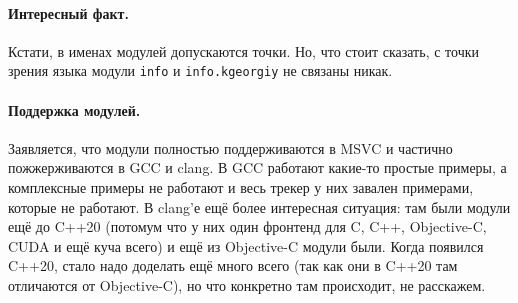\documentclass{article}
\begin{document}
    \paragraph{Интересный факт.}
    Кстати, в именах модулей допускаются точки. Но, что стоит сказать, с точки зрения языка модули \texttt{info} и \texttt{info.kgeorgiy} не связаны никак.
    \paragraph{Поддержка модулей.}
    Заявляется, что модули полностью поддерживаются в MSVC и частично пожжерживаются в GCC и clang. В GCC работают какие-то простые примеры, а комплексные примеры не работают и весь трекер у них завален примерами, которые не работают. В clang'е ещё более интересная ситуация: там были модули ещё до C++20 (потомум что у них один фронтенд для C, C++, Objective-C, CUDA и ещё куча всего) и ещё из Objective-C модули были. Когда появился C++20, стало надо доделать ещё много всего (так как они в C++20 там отличаются от Objective-C), но что конкретно там происходит, не расскажем.
\end{document}

